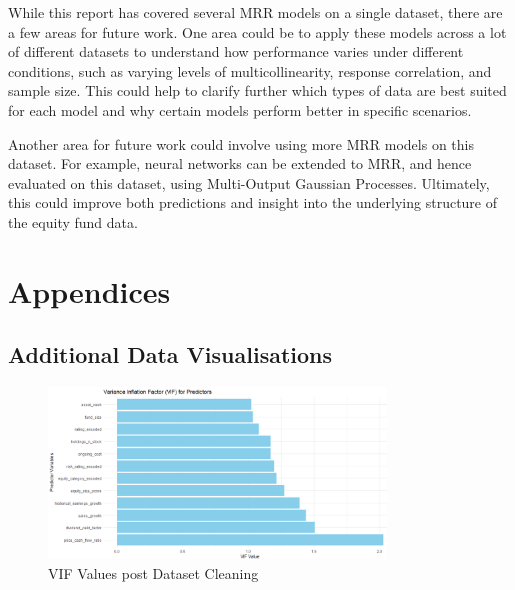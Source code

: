 \documentclass[11pt]{report} %
\begin{document}
While this report has covered several MRR models on a single dataset, there are a few areas for future work. One area could be to apply these models across a lot of different datasets to understand how performance varies under different conditions, such as varying levels of multicollinearity, response correlation, and sample size. This could help to clarify further which types of data are best suited for each model and why certain models perform better in specific scenarios.

Another area for future work could involve using more MRR models on this dataset. For example, neural networks can be extended to MRR, and hence evaluated on this dataset, using Multi-Output Gaussian Processes. Ultimately, this could improve both predictions and insight into the underlying structure of the equity fund data.

\makeatletter
\renewcommand\@biblabel[1]{#1.} %
\makeatother



\appendix
\chapter{Appendices}

\section{Additional Data Visualisations}


\begin{figure}[H]
    \centering
    \includegraphics[width=0.8\textwidth]{Plots/VIF.png}
    \caption{VIF Values post Dataset Cleaning}
    \label{fig:vif}
\end{figure}
\end{document}
